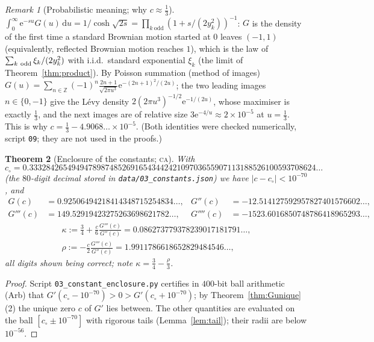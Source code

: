 \documentclass[11pt,a4paper]{article}
\newtheorem{theorem}{Theorem}[section]
\theoremstyle{definition}
\theoremstyle{remark}
\newtheorem{remark}[theorem]{Remark}
\newcommand{\Z}{\mathbb{Z}}
\newcommand{\ee}{\mathrm{e}}
\newcommand{\dd}{\mathrm{d}}
\newcommand{\CA}{\textsc{ca}}
\begin{document}
\begin{remark}[Probabilistic meaning; why $c\approx\frac13$]\label{rem:theta}
$\int_0^\infty\ee^{-su}G(u)\,\dd u=1/\cosh\sqrt{2s}=\prod_{k\ \mathrm{odd}}(1+s/(2y_k^2))^{-1}$: $G$ is the density of the
first time a standard Brownian motion started at $0$ leaves $(-1,1)$ (equivalently, reflected Brownian motion
reaches $1$), which is the law of $\sum_{k\ \rm odd}\xi_k/(2y_k^2)$ with i.i.d.\ standard exponential $\xi_k$ (the
limit of Theorem~\ref{thm:product}). By Poisson summation (method of images)
$G(u)=\sum_{n\in\Z}(-1)^n\frac{2n+1}{\sqrt{2\pi u^3}}\ee^{-(2n+1)^2/(2u)}$; the two leading images $n\in\{0,-1\}$
give the L\'evy density $2(2\pi u^3)^{-1/2}\ee^{-1/(2u)}$, whose maximiser is exactly $\frac13$, and the next
images are of relative size $3\ee^{-4/u}\approx 2\times10^{-5}$ at $u=\frac13$. This is why
$c=\frac13-4.9068\ldots\times10^{-5}$. (Both identities were checked numerically, script \texttt{09}; they are
not used in the proofs.)
\end{remark}

\begin{theorem}[Enclosure of the constants; \CA]\label{thm:c}
With
\[
 c_\circ=0.33328426549494789874852691654344242109703655907113188526100593708624\ldots
\]
(the $80$-digit decimal stored in \texttt{data/03\_constants.json}) we have $|c-c_\circ|<10^{-70}$, and
\begin{align*}
 G(c)&=0.92506494218414348715254834\ldots, & G''(c)&=-12.514127592957827401576602\ldots,\\
 G'''(c)&=149.52919423275263698621782\ldots,& G''''(c)&=-1523.6016850748786418965293\ldots,
\end{align*}
\begin{gather*}
 \kappa:=\frac34+\frac c6\frac{G'''(c)}{G''(c)}=0.086273779378239017181791\ldots,\\
 \rho:=-\frac c2\frac{G'''(c)}{G''(c)}=1.9911786618652829484546\ldots,
\end{gather*}
all digits shown being correct; note $\kappa=\frac34-\frac\rho3$.
\end{theorem}
\begin{proof}
Script \texttt{03\_constant\_enclosure.py} certifies in $400$-bit ball arithmetic (Arb) that
$G'(c_\circ-10^{-70})>0>G'(c_\circ+10^{-70})$; by Theorem~\ref{thm:Gunique}(2) the unique zero $c$ of $G'$ lies
between. The other quantities are evaluated on the ball $[c_\circ\pm10^{-70}]$ with rigorous tails
(Lemma~\ref{lem:tail}); their radii are below $10^{-56}$.
\end{proof}
\end{document}
